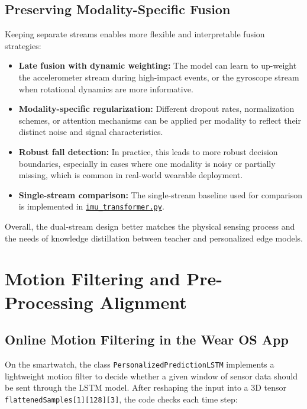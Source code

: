 \subsection{Preserving Modality-Specific Fusion}

Keeping separate streams enables more flexible and interpretable fusion strategies:
\begin{itemize}
    \item \textbf{Late fusion with dynamic weighting:} The model can learn to up-weight the accelerometer stream during high-impact events, or the gyroscope stream when rotational dynamics are more informative.
    \item \textbf{Modality-specific regularization:} Different dropout rates, normalization schemes, or attention mechanisms can be applied per modality to reflect their distinct noise and signal characteristics.
    \item \textbf{Robust fall detection:} In practice, this leads to more robust decision boundaries, especially in cases where one modality is noisy or partially missing, which is common in real-world wearable deployment.
    \item \textbf{Single-stream comparison:} The single-stream baseline used for comparison is implemented in
    \href{https://github.com/lolout1/FeatureKD/blob/main/Models/imu_transformer.py}{\texttt{imu\_transformer.py}}.
\end{itemize}

Overall, the dual-stream design better matches the physical sensing process and the needs of knowledge distillation between teacher and personalized edge models.

\section{Motion Filtering and Pre-Processing Alignment}

\subsection{Online Motion Filtering in the Wear OS App}

On the smartwatch, the class \texttt{PersonalizedPredictionLSTM} implements a lightweight motion filter to decide whether a given window of sensor data should be sent through the LSTM model. After reshaping the input into a 3D tensor \texttt{flattenedSamples[1][128][3]}, the code checks each time step:

